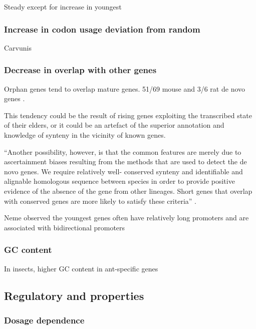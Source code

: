     Steady except for increase in youngest
    \cite{neme_phylogenetic_2013}

  \subsubsection{Increase in codon usage deviation from random}

    Carvunis \cite{carvunis_proto-genes_2012}

  \subsubsection{Decrease in overlap with other genes}

    Orphan genes tend to overlap mature genes. 51/69 mouse and 3/6 rat
    de novo genes \cite{murphy_novo_2012}.

    This tendency could be the result of rising genes exploiting the
    transcribed state of their elders, or it could be an artefact of
    the superior annotation and knowledge of synteny in the vicinity of
    known genes.

    ``Another possibility, however, is that the common features are
    merely due to ascertainment biases resulting from the methods that
    are used to detect the de novo genes. We require relatively well-
    conserved synteny and identifiable and alignable homologous
    sequence between species in order to provide positive evidence of
    the absence of the gene from other lineages. Short genes that
    overlap with conserved genes are more likely to satisfy these
    criteria'' \cite[pp. 8]{murphy_novo_2012}.

    Neme observed the youngest genes often have relatively long
    promoters and are associated with bidirectional promoters
    \cite{neme_phylogenetic_2013}

  \subsubsection{GC content}

    In insects, higher GC content in ant-specific genes
    \cite{wissler_mechanisms_2013}


\subsection{Regulatory and properties}

  \subsubsection{Dosage dependence}

